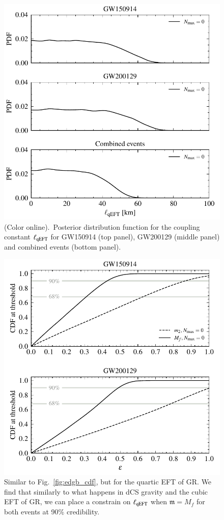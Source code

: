 \documentclass[twocolumn,
               prd,
               aps,
               superscriptaddress,
               tightenlines,
               nofootinbib,
               eqsecnum,
               amsfonts,
               amsmath,
               longbibliography]{revtex4-1}
\newcommand{\gm}{\mathfrak{m}}
\begin{document}
\begin{figure}[t]
\includegraphics[width=\columnwidth]{figs/qeft_posteriors_combined.pdf}
\caption{(Color online).~Posterior distribution function for the coupling constant $\ell_{\rm qEFT}$ for
GW150914 (top panel), GW200129 (middle panel) and combined events (bottom panel).
}
\label{fig:qEFT_exec_sum}
\end{figure}

\begin{figure}[t]
\includegraphics[width=\columnwidth]{figs/qeft_cdf_varying_threshold.pdf}
\caption{Similar to Fig.~\ref{fig:edgb_cdf}, but for the quartic EFT of GR.
We find that similarly to what happens in dCS gravity and the cubic EFT of GR, we
can place a constrain on $\ell_{\rm qEFT}$ when $\gm = M_f$ for both events at 90\% credibility.
}
\label{fig:qEFT_cdf}
\end{figure}
\end{document}
